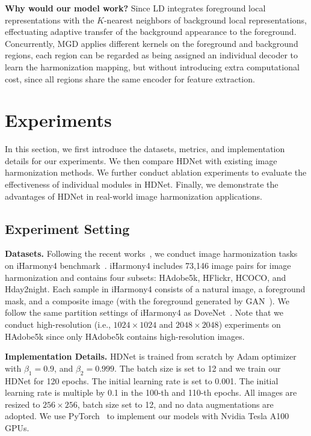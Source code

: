 \documentclass[sigconf]{acmart}
\begin{document}
\textbf{Why would our model work?} Since LD integrates foreground local representations with the $K$-nearest neighbors of background local representations, effectuating adaptive transfer of the background appearance to the foreground. Concurrently, MGD applies different kernels on the foreground and background regions, each region can be regarded as being assigned an individual decoder to learn the harmonization mapping, but without introducing extra computational cost, since all regions share the same encoder for feature extraction. 



\section{Experiments}
In this section, we first introduce the datasets, metrics, and implementation details for our experiments. We then compare HDNet with existing image harmonization methods. We further conduct ablation experiments to evaluate the effectiveness of individual modules in HDNet. Finally, we demonstrate the advantages of HDNet in real-world image harmonization applications.
\subsection{Experiment Setting}

\noindent
\textbf{Datasets.} Following the recent works~\cite{Bargainnet,RAIN,DoveNet}, we conduct image harmonization tasks on iHarmony4 benchmark~\cite{DoveNet}. iHarmony4 includes 73,146 image pairs for image harmonization and contains four subsets: HAdobe5k, HFlickr, HCOCO, and Hday2night. Each sample in iHarmony4 consists of a natural image, a foreground mask, and a composite image (with the foreground generated by GAN~\cite{GAN}). We follow the same partition settings of iHarmony4 as DoveNet~\cite{DoveNet}. Note that we conduct high-resolution (i.e., $1024\times1024$ and $2048\times2048$) experiments on HAdobe5k since only HAdobe5k contains high-resolution images.

\noindent
\textbf{Implementation Details.}
HDNet is trained from scratch by Adam optimizer with $\beta_1=0.9$, and $\beta_2=0.999$. The batch size is set to 12 and we train our HDNet for 120 epochs. The initial learning rate is set to 0.001. The initial learning rate is multiple by 0.1 in the 100-th and 110-th epochs. All images are resized to $256\times256$, batch size set to 12, and no data augmentations are adopted. We use PyTorch~\cite{paszke2019pytorch} to implement our models with Nvidia Tesla A100 GPUs.
\end{document}
